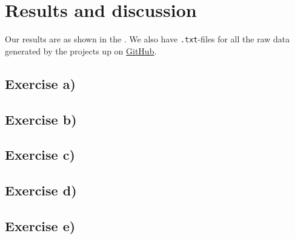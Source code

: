 \documentclass{article}
\begin{document}
\section{Results and discussion} \label{sec:Results}

  Our results are as shown in the . We also have \texttt{.txt}-files for all the raw data generated by the projects up on \href{https://github.com/Erikbgram/Fys3150}{GitHub}. \\

  \subsection{Exercise a)} \label{sec:Results a)}



  \subsection{Exercise b)} \label{sec:Results b)}



  \subsection{Exercise c)} \label{sec:Results c)}

  \subsection{Exercise d)} \label{sec:Results d)}




  \subsection{Exercise e)} \label{sec:Results e)}
\end{document}
